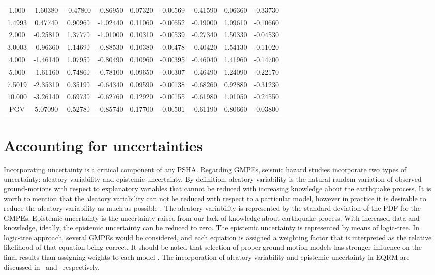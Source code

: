 \begin{table}
\begin{tabular}{ccccccccc}
1.000   & 1.60380  & -0.47800  & -0.86950  & 0.07320   & -0.00569 & -0.41590 & 0.06360  & -0.33730 \\
1.4993  & 0.47740  & 0.90960   & -1.02440  & 0.11060   & -0.00652 & -0.19000 & 1.09610  & -0.10660 \\
2.000   & -0.25810 & 1.37770   & -1.01000  & 0.10310   & -0.00539 & -0.27340 & 1.50330  & -0.04530 \\
3.0003  & -0.96360 & 1.14690   & -0.88530  & 0.10380   & -0.00478 & -0.40420 & 1.54130  & -0.11020 \\
4.000   & -1.46140 & 1.07950   & -0.80490  & 0.10960   & -0.00395 & -0.46040 & 1.41960  & -0.14700 \\
5.000   & -1.61160 & 0.74860   & -0.78100  & 0.09650   & -0.00307 & -0.46490 & 1.24090  & -0.22170 \\
7.5019  & -2.35310 & 0.35190   & -0.64340  & 0.09590   & -0.00138 & -0.68260 & 0.92880  & -0.31230 \\
10.000  & -3.26140 & 0.69730   & -0.62760  & 0.12920   & -0.00155 & -0.61980 & 1.01050  & -0.24550 \\
PGV     & 5.07090  & 0.52780   & -0.85740  & 0.17700   & -0.00501 & -0.61190 & 0.80660  & -0.03800 \\
\hline
\end{tabular}
\end{table}


\normalsize



\section{Accounting for uncertainties}\label{sec:uncertain}
Incorporating uncertainty is a critical component of any PSHA.
Regarding GMPEs, seismic hazard studies incorporate two types of
uncertainty: aleatory variability and epistemic uncertainty. By
definition, aleatory variability is the natural random variation of
observed ground-motions with respect to explanatory variables that
cannot be reduced with increasing knowledge about the earthquake
process. It is worth to mention that the aleatory variability can
not be reduced with respect to a particular model, however in
practice it is desirable to reduce the aleatory variability as much
as possible \citep{eqrm_Atik10}. The aleatory variability is
represented by the standard deviation of the PDF for the GMPEs.
Epistemic uncertainty is the uncertainty raised from our lack of
knowledge about earthquake process. With increased data and
knowledge, ideally, the epistemic uncertainty can be reduced to
zero. The epistemic uncertainty is represented by means of
logic-tree. In logic-tree approach, several GMPEs would be
considered, and each equation is assigned a weighting factor that is
interpreted as the relative likelihood of that equation being
correct. It should be noted that selection of proper ground motion
models has stronger influence on the final results than assigning
weights to each model \citep{eqrm_Scherbaum05}. The incorporation of
aleatory variability and epistemic uncertainty in EQRM are discussed
in~ and~
respectively.





